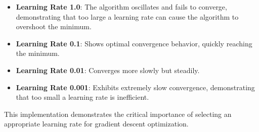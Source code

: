 \documentclass[hidelinks]{report}
\begin{document}
\begin{itemize}
    \item \textbf{Learning Rate 1.0}: The algorithm oscillates and fails to converge, demonstrating that too large a learning rate can cause the algorithm to overshoot the minimum.
    \item \textbf{Learning Rate 0.1}: Shows optimal convergence behavior, quickly reaching the minimum.
    \item \textbf{Learning Rate 0.01}: Converges more slowly but steadily.
    \item \textbf{Learning Rate 0.001}: Exhibits extremely slow convergence, demonstrating that too small a learning rate is inefficient.
\end{itemize}

\noindent This implementation demonstrates the critical importance of selecting an appropriate learning rate for gradient descent optimization.

    
\clearpage
{}
\end{document}
